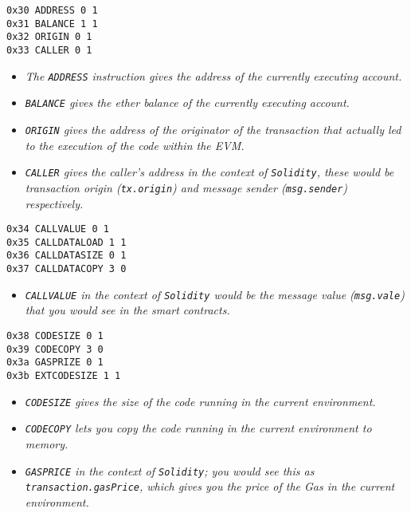 \begin{lstlisting}[language=Solidity,numbers=none]
0x30 ADDRESS 0 1
0x31 BALANCE 1 1
0x32 ORIGIN 0 1
0x33 CALLER 0 1
\end{lstlisting}

\begin{itemize}
\tightlist
\item
  \emph{The \texttt{ADDRESS} instruction gives the address of the
  currently executing account.}
\item
  \emph{\texttt{BALANCE} gives the ether balance of the currently
  executing account.}
\item
  \emph{\texttt{ORIGIN} gives the address of the originator of the
  transaction that actually led to the execution of the code within the
  EVM.}
\item
  \emph{\texttt{CALLER} gives the caller's address in the context of
  \texttt{Solidity}, these would be transaction origin
  (\texttt{tx.origin}) and message sender (\texttt{msg.sender})
  respectively.}
\end{itemize}

\begin{lstlisting}[language=Solidity,numbers=none]
0x34 CALLVALUE 0 1
0x35 CALLDATALOAD 1 1
0x36 CALLDATASIZE 0 1
0x37 CALLDATACOPY 3 0
\end{lstlisting}

\begin{itemize}
\tightlist
\item
  \emph{\texttt{CALLVALUE} in the context of \texttt{Solidity} would be
  the message value (\texttt{msg.vale}) that you would see in the smart
  contracts.}
\end{itemize}

\begin{lstlisting}[language=Solidity,numbers=none]
0x38 CODESIZE 0 1
0x39 CODECOPY 3 0
0x3a GASPRIZE 0 1
0x3b EXTCODESIZE 1 1
\end{lstlisting}

\begin{itemize}
\tightlist
\item
  \emph{\texttt{CODESIZE} gives the size of the code running in the
  current environment.}
\item
  \emph{\texttt{CODECOPY} lets you copy the code running in the current
  environment to memory.}
\item
  \emph{\texttt{GASPRICE} in the context of \texttt{Solidity}; you would
  see this as \texttt{transaction.gasPrice}, which gives you the price
  of the Gas in the current environment.}
\end{itemize}

